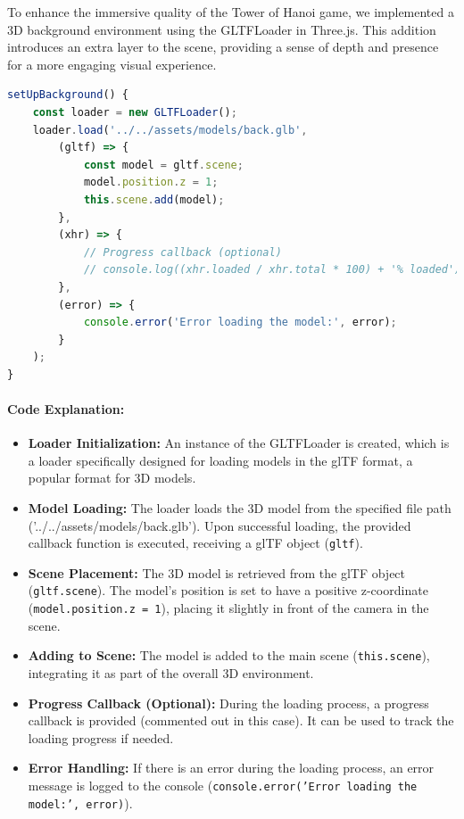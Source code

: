 \documentclass{article}
\begin{document}
To enhance the immersive quality of the Tower of Hanoi game, we implemented a 3D background environment using the GLTFLoader in Three.js. This addition introduces an extra layer to the scene, providing a sense of depth and presence for a more engaging visual experience.

\begin{lstlisting}[language=JavaScript, caption={JS Code for Including 3D Background}]
setUpBackground() {
    const loader = new GLTFLoader();
    loader.load('../../assets/models/back.glb', 
        (gltf) => {
            const model = gltf.scene;
            model.position.z = 1;
            this.scene.add(model);
        },
        (xhr) => {
            // Progress callback (optional)
            // console.log((xhr.loaded / xhr.total * 100) + '% loaded');
        },
        (error) => {
            console.error('Error loading the model:', error);
        }
    );
}
\end{lstlisting}

\paragraph{Code Explanation:}

\begin{itemize}
    \item \textbf{Loader Initialization:} An instance of the GLTFLoader is created, which is a loader specifically designed for loading models in the glTF format, a popular format for 3D models.

    \item \textbf{Model Loading:} The loader loads the 3D model from the specified file path ('../../assets/models/back.glb'). Upon successful loading, the provided callback function is executed, receiving a glTF object (\texttt{gltf}).

    \item \textbf{Scene Placement:} The 3D model is retrieved from the glTF object (\texttt{gltf.scene}). The model's position is set to have a positive z-coordinate (\texttt{model.position.z = 1}), placing it slightly in front of the camera in the scene.

    \item \textbf{Adding to Scene:} The model is added to the main scene (\texttt{this.scene}), integrating it as part of the overall 3D environment.

    \item \textbf{Progress Callback (Optional):} During the loading process, a progress callback is provided (commented out in this case). It can be used to track the loading progress if needed.

    \item \textbf{Error Handling:} If there is an error during the loading process, an error message is logged to the console (\texttt{console.error('Error loading the model:', error)}).
\end{itemize}
\end{document}
